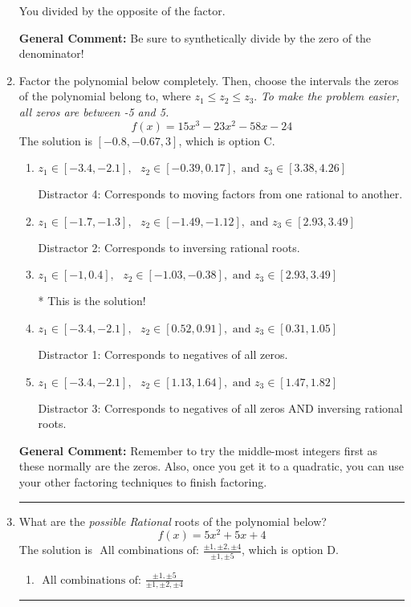 \documentclass{extbook}[14pt]
\newcommand{\litem}[1]{\item #1

\rule{\textwidth}{0.4pt}}
\begin{document}
\begin{enumerate}
{\begin{enumerate}[label=\Alph*.]
 You divided by the opposite of the factor.
\end{enumerate}

\textbf{General Comment:} Be sure to synthetically divide by the zero of the denominator!
}
\litem{
Factor the polynomial below completely. Then, choose the intervals the zeros of the polynomial belong to, where $z_1 \leq z_2 \leq z_3$. \textit{To make the problem easier, all zeros are between -5 and 5.}
\[ f(x) = 15x^{3} -23 x^{2} -58 x -24 \]The solution is \( [-0.8, -0.67, 3] \), which is option C.\begin{enumerate}[label=\Alph*.]
\item \( z_1 \in [-3.4, -2.1], \text{   }  z_2 \in [-0.39, 0.17], \text{   and   } z_3 \in [3.38, 4.26] \)

 Distractor 4: Corresponds to moving factors from one rational to another.
\item \( z_1 \in [-1.7, -1.3], \text{   }  z_2 \in [-1.49, -1.12], \text{   and   } z_3 \in [2.93, 3.49] \)

 Distractor 2: Corresponds to inversing rational roots.
\item \( z_1 \in [-1, 0.4], \text{   }  z_2 \in [-1.03, -0.38], \text{   and   } z_3 \in [2.93, 3.49] \)

* This is the solution!
\item \( z_1 \in [-3.4, -2.1], \text{   }  z_2 \in [0.52, 0.91], \text{   and   } z_3 \in [0.31, 1.05] \)

 Distractor 1: Corresponds to negatives of all zeros.
\item \( z_1 \in [-3.4, -2.1], \text{   }  z_2 \in [1.13, 1.64], \text{   and   } z_3 \in [1.47, 1.82] \)

 Distractor 3: Corresponds to negatives of all zeros AND inversing rational roots.
\end{enumerate}

\textbf{General Comment:} Remember to try the middle-most integers first as these normally are the zeros. Also, once you get it to a quadratic, you can use your other factoring techniques to finish factoring.
}
\litem{
What are the \textit{possible Rational} roots of the polynomial below?
\[ f(x) = 5x^{2} +5 x + 4 \]The solution is \( \text{ All combinations of: }\frac{\pm 1,\pm 2,\pm 4}{\pm 1,\pm 5} \), which is option D.\begin{enumerate}[label=\Alph*.]
\item \( \text{ All combinations of: }\frac{\pm 1,\pm 5}{\pm 1,\pm 2,\pm 4} \)


\end{enumerate}}
\end{enumerate}
\end{document}
